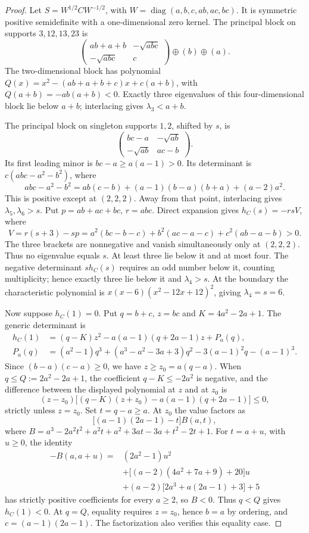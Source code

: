 \begin{proof}
Let $S=W^{1/2}CW^{-1/2}$, with $W=\operatorname{diag}(a,b,c,ab,ac,bc)$.
It is symmetric positive semidefinite with a one-dimensional zero kernel.
The principal block on supports $3,12,13,23$ is
\[
 \begin{pmatrix}ab+a+b&-\sqrt{abc}\\-\sqrt{abc}&c\end{pmatrix}
 \mathbin{\oplus}(b)\mathbin{\oplus}(a).
\]
The two-dimensional block has polynomial
$Q(x)=x^2-(ab+a+b+c)x+c(a+b)$, with $Q(a+b)=-ab(a+b)<0$.
Exactly three eigenvalues of this four-dimensional block lie below $a+b$;
interlacing gives $\lambda_3<a+b$.

The principal block on singleton supports $1,2$, shifted by $s$, is
\[
 \begin{pmatrix}bc-a&-\sqrt{ab}\\-\sqrt{ab}&ac-b\end{pmatrix}.
\]
Its first leading minor is $bc-a\geq a(a-1)>0$. Its determinant is
$c(abc-a^2-b^2)$, where
\[
 abc-a^2-b^2=ab(c-b)+(a-1)(b-a)(b+a)+(a-2)a^2.
\]
This is positive except at $(2,2,2)$. Away from that point,
interlacing gives $\lambda_5,\lambda_6>s$. Put $p=ab+ac+bc$, $r=abc$.
Direct expansion gives $h_C(s)=-rsV$, where
\[
 V=r(s+3)-sp=a^2(bc-b-c)+b^2(ac-a-c)+c^2(ab-a-b)>0.
\]
The three brackets are nonnegative and vanish simultaneously only
at $(2,2,2)$. Thus no eigenvalue equals $s$. At least three lie below it
and at most four. The negative determinant $s h_C(s)$ requires
an odd number below it, counting multiplicity; hence exactly three
lie below it and $\lambda_4>s$. At the boundary the characteristic
polynomial is $x(x-6)(x^2-12x+12)^2$, giving $\lambda_4=s=6$.

Now suppose $h_C(1)=0$.
Put $q=b+c$, $z=bc$ and $K=4a^2-2a+1$. The generic determinant is
\begin{align*}
 h_C(1)&=(q-K)z^2-a(a-1)(q+2a-1)z+P_a(q),\\
 P_a(q)&=(a^2-1)q^3+(a^3-a^2-3a+3)q^2
          -3(a-1)^2q-(a-1)^3.
\end{align*}
Since $(b-a)(c-a)\geq0$, we have $z\geq z_0=a(q-a)$. When
$q\leq Q:=2a^2-2a+1$, the coefficient $q-K\leq-2a^2$ is negative,
and the difference between the displayed polynomial at $z$ and at
$z_0$ is
\[
 (z-z_0)\bigl[(q-K)(z+z_0)-a(a-1)(q+2a-1)\bigr]\leq0,
\]
strictly unless $z=z_0$. Set $t=q-a\geq a$. At $z_0$ the value factors as
\[
 \bigl[(a-1)(2a-1)-t\bigr]B(a,t),
\]
where $B=a^3-2a^2t^2+a^2t+a^2+3at-3a+t^2-2t+1$. For
$t=a+u$, with $u\geq0$, the identity
\begin{align*}
 -B(a,a+u)={}&(2a^2-1)u^2\\
 &+\bigl[(a-2)(4a^2+7a+9)+20\bigr]u\\
 &+(a-2)\bigl[2a^3+a(2a-1)+3\bigr]+5
\end{align*}
has strictly positive coefficients for every $a\geq2$, so $B<0$.
Thus $q<Q$ gives $h_C(1)<0$. At $q=Q$, equality
requires $z=z_0$, hence $b=a$ by ordering, and $c=(a-1)(2a-1)$.
The factorization also verifies this equality case.


\end{proof}
